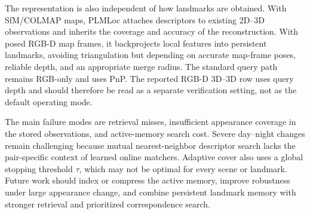 \documentclass[letterpaper,10 pt,conference]{ieeeconf}
\newcommand{\method}{PLMLoc}
\begin{document}
The representation is also independent of how landmarks are obtained. With SfM/COLMAP maps, \method{} attaches descriptors to existing 2D--3D observations and inherits the coverage and accuracy of the reconstruction. With posed RGB-D map frames, it backprojects local features into persistent landmarks, avoiding triangulation but depending on accurate map-frame poses, reliable depth, and an appropriate merge radius. The standard query path remains RGB-only and uses PnP. The reported RGB-D 3D--3D row uses query depth and should therefore be read as a separate verification setting, not as the default operating mode.

The main failure modes are retrieval misses, insufficient appearance coverage in the stored observations, and active-memory search cost. Severe day--night changes remain challenging because mutual nearest-neighbor descriptor search lacks the pair-specific context of learned online matchers. Adaptive cover also uses a global stopping threshold $\tau$, which may not be optimal for every scene or landmark. Future work should index or compress the active memory, improve robustness under large appearance change, and combine persistent landmark memory with stronger retrieval and prioritized correspondence search.



\end{document}
